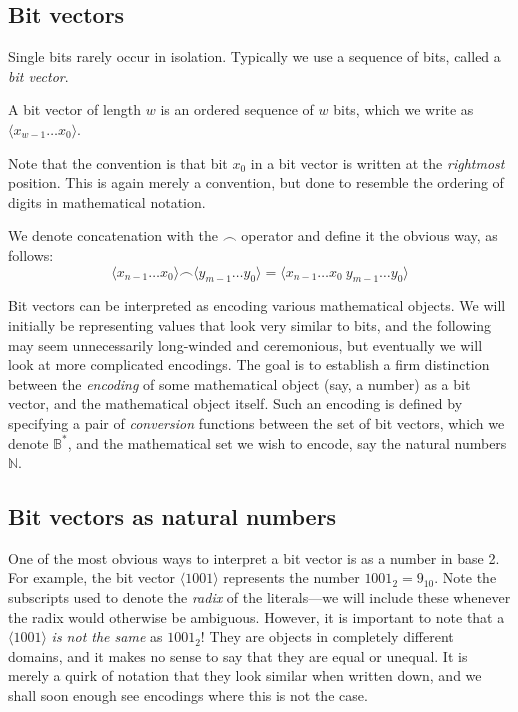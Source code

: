 \subsection{Bit vectors}

\newcommand\bitvector[1]{\langle #1 \rangle}
\newcommand\bitconcat{\frown}

Single bits rarely occur in isolation.  Typically we use a sequence of
bits, called a \emph{bit vector}.

\begin{definition}
  A bit vector of length $w$ is an ordered sequence of $w$ bits, which
  we write as $\bitvector{x_{w-1}\ldots{}x_{0}}$.
\end{definition}

Note that the convention is that bit $x_{0}$ in a bit vector is
written at the \emph{rightmost} position.  This is again merely a
convention, but done to resemble the ordering of digits in
mathematical notation.

\begin{definition}
  We denote concatenation with the $\bitconcat$ operator and define it
  the obvious way, as follows:
  \[
    \bitvector{x_{n-1}\ldots{}x_{0}} \bitconcat \bitvector{y_{m-1}\ldots{}y_{0}} =
    \bitvector{x_{n-1}\ldots{}x_{0}~y_{m-1}\ldots{}y_{0}}
  \]
\end{definition}


Bit vectors can be interpreted as encoding various mathematical
objects.  We will initially be representing values that look very
similar to bits, and the following may seem unnecessarily long-winded
and ceremonious, but eventually we will look at more complicated
encodings.  The goal is to establish a firm distinction between the
\emph{encoding} of some mathematical object (say, a number) as a bit
vector, and the mathematical object itself.  Such an encoding is
defined by specifying a pair of \emph{conversion} functions between
the set of bit vectors, which we denote $\mathbb{B}^{*}$, and the
mathematical set we wish to encode, say the natural numbers
$\mathbb{N}$.

\subsection{Bit vectors as natural numbers}

One of the most obvious ways to interpret a bit vector is as a number
in base 2.  For example, the bit vector $\bitvector{1001}$ represents
the number $1001_{2} = 9_{10}$.  Note the subscripts used to denote
the \emph{radix} of the literals---we will include these whenever the
radix would otherwise be ambiguous.  However, it is important to note
that a $\bitvector{1001}$ \emph{is not the same} as $1001_{2}$!  They
are objects in completely different domains, and it makes no sense to
say that they are equal or unequal.  It is merely a quirk of notation
that they look similar when written down, and we shall soon enough see
encodings where this is not the case.

